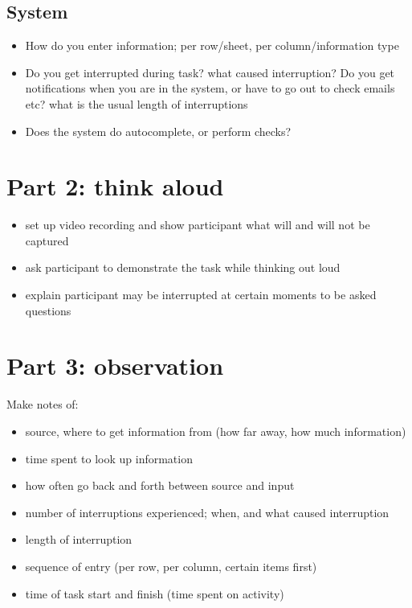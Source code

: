 \subsection{System}
\begin{itemize}
\item How do you enter information; per row/sheet, per column/information type
\item Do you get interrupted during task? what caused interruption? Do you get notifications when you are in the system, or have to go out to check emails etc? what is the usual length of interruptions
\item Does the system do autocomplete, or perform checks?
\end{itemize}

\section{Part 2: think aloud}
\begin{itemize}
\item set up video recording and show participant what will and will not be captured
\item ask participant to demonstrate the task while thinking out loud
\item explain participant may be interrupted at certain moments to be asked questions
\end{itemize}

\section{Part 3: observation}
Make notes of:
\begin{itemize}
\item source, where to get information from (how far away, how much information)
\item time spent to look up information
\item how often go back and forth between source and input
\item number of interruptions experienced; when, and what caused interruption
\item length of interruption
\item sequence of entry (per row, per column, certain items first)
\item time of task start and finish (time spent on activity)
\end{itemize}


